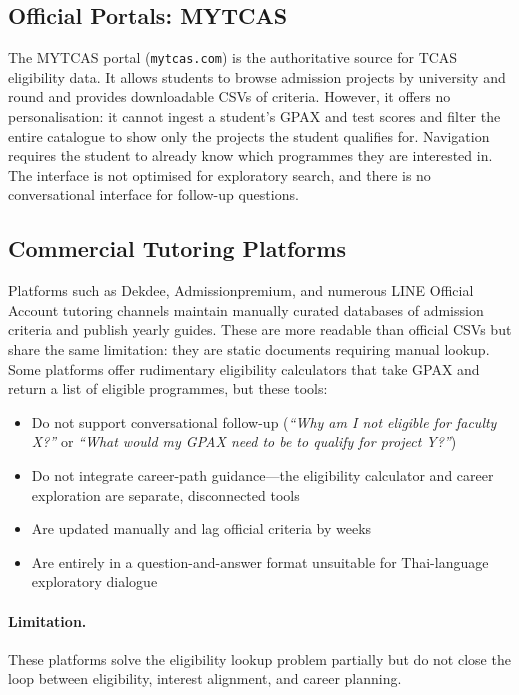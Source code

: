 ﻿\documentclass[12pt,a4paper]{article}
\begin{document}
\subsection{Official Portals: MYTCAS}

The MYTCAS portal (\texttt{mytcas.com}) is the authoritative source for TCAS
eligibility data. It allows students to browse admission projects by university and
round and provides downloadable CSVs of criteria. However, it offers no
personalisation: it cannot ingest a student's GPAX and test scores and filter the
entire catalogue to show only the projects the student qualifies for. Navigation
requires the student to already know which programmes they are interested in. The
interface is not optimised for exploratory search, and there is no conversational
interface for follow-up questions.

\subsection{Commercial Tutoring Platforms}

Platforms such as Dekdee, Admissionpremium, and numerous LINE Official Account tutoring
channels maintain manually curated databases of admission criteria and publish
yearly guides. These are more readable than official CSVs but share the same
limitation: they are static documents requiring manual lookup. Some platforms offer
rudimentary eligibility calculators that take GPAX and return a list of eligible
programmes, but these tools:

\begin{itemize}[leftmargin=2em]
    \item Do not support conversational follow-up (\emph{``Why am I not eligible for
    faculty X?''} or \emph{``What would my GPAX need to be to qualify for project Y?''})
    \item Do not integrate career-path guidance—the eligibility calculator and career
    exploration are separate, disconnected tools
    \item Are updated manually and lag official criteria by weeks
    \item Are entirely in a question-and-answer format unsuitable for Thai-language
    exploratory dialogue
\end{itemize}

\paragraph{Limitation.} These platforms solve the eligibility lookup problem partially
but do not close the loop between eligibility, interest alignment, and career planning.
\end{document}
